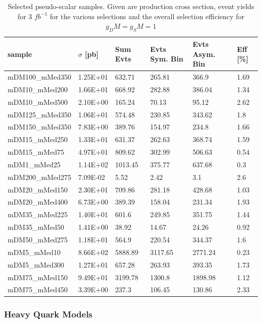 \begin{table}[h]
\centering
\begin{tabular}{llllll}
\hline
sample             & $\sigma$ [pb] & Sum Evts       & Evts Sym. Bin & Evts Asym. Bin & Eff  [\%]   \\\hline
mDM100\_mMed350 & 1.25E+01 & 632.71  & 265.81  & 366.9   & 1.69 \\
mDM10\_mMed200  & 1.66E+01 & 668.92  & 282.88  & 386.04  & 1.34 \\
mDM10\_mMed500  & 2.10E+00 & 165.24  & 70.13   & 95.12   & 2.62 \\
mDM125\_mMed350 & 1.06E+01 & 574.48  & 230.85  & 343.62  & 1.8  \\
mDM150\_mMed350 & 7.83E+00 & 389.76  & 154.97  & 234.8   & 1.66 \\
mDM15\_mMed250  & 1.33E+01 & 631.37  & 262.63  & 368.74  & 1.59 \\
mDM15\_mMed75   & 4.97E+01 & 809.62  & 302.99  & 506.63  & 0.54 \\
mDM1\_mMed25    & 1.14E+02 & 1013.45 & 375.77  & 637.68  & 0.3  \\
mDM200\_mMed275 & 7.09E-02 & 5.52    & 2.42    & 3.1     & 2.6  \\
mDM20\_mMed150  & 2.30E+01 & 709.86  & 281.18  & 428.68  & 1.03 \\
mDM20\_mMed400  & 6.73E+00 & 389.39  & 158.04  & 231.34  & 1.93 \\
mDM35\_mMed225  & 1.40E+01 & 601.6   & 249.85  & 351.75  & 1.44 \\
mDM35\_mMed50   & 1.41E+00 & 38.92   & 14.67   & 24.26   & 0.92 \\
mDM50\_mMed275  & 1.18E+01 & 564.9   & 220.54  & 344.37  & 1.6  \\
mDM5\_mMed10    & 8.66E+02 & 5888.89 & 3117.65 & 2771.24 & 0.23 \\
mDM5\_mMed300   & 1.27E+01 & 657.28  & 263.93  & 393.35  & 1.73 \\
mDM75\_mMed150  & 9.49E+01 & 3199.78 & 1300.8  & 1898.98 & 1.12 \\
mDM75\_mMed450  & 3.39E+00 & 237.3   & 106.45  & 130.86  & 2.33 \\
\hline
\end{tabular}
\caption{Selected pseudo-scalar samples. Given are production cross section, event yields for 3 $fb^{-1 }$ for the various selections and the overall selection efficiency for $g_DM=g_SM=1$}
\label{tab:dm_P_g1_3fb}
\end{table}


\subsubsection{Heavy Quark Models}

